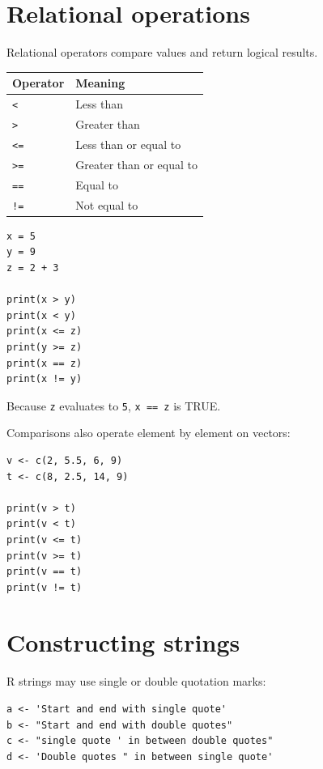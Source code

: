 \section{Relational operations}

Relational operators compare values and return logical results.

\begin{dstable}
\begin{tabularx}{\linewidth}{@{}p{2.4cm}X@{}}
\toprule
\rowcolor{DSPaleBlue!92}
Operator & Meaning \\
\midrule
\texttt{<} & Less than \\
\texttt{>} & Greater than \\
\texttt{<=} & Less than or equal to \\
\texttt{>=} & Greater than or equal to \\
\texttt{==} & Equal to \\
\texttt{!=} & Not equal to \\
\bottomrule
\end{tabularx}
\end{dstable}

\begin{lstlisting}[style=dsr]
x = 5
y = 9
z = 2 + 3

print(x > y)
print(x < y)
print(x <= z)
print(y >= z)
print(x == z)
print(x != y)
\end{lstlisting}

Because \texttt{z} evaluates to \texttt{5}, \texttt{x == z} is TRUE.

Comparisons also operate element by element on vectors:

\begin{lstlisting}[style=dsr]
v <- c(2, 5.5, 6, 9)
t <- c(8, 2.5, 14, 9)

print(v > t)
print(v < t)
print(v <= t)
print(v >= t)
print(v == t)
print(v != t)
\end{lstlisting}

\section{Constructing strings}

R strings may use single or double quotation marks:

\begin{lstlisting}[style=dsr]
a <- 'Start and end with single quote'
b <- "Start and end with double quotes"
c <- "single quote ' in between double quotes"
d <- 'Double quotes " in between single quote'
\end{lstlisting}

